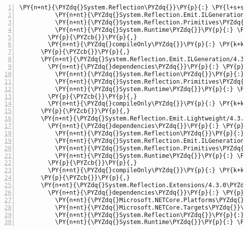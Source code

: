 \begin{Verbatim}[commandchars=\\\{\},numbers=left,firstnumber=1,stepnumber=1,numberblanklines=0]
          \PY{n+nt}{\PYZdq{}System.Reflection\PYZdq{}}\PY{p}{:} \PY{l+s+s2}{\PYZdq{}4.3.0\PYZdq{}}\PY{p}{,}
          \PY{n+nt}{\PYZdq{}System.Reflection.Emit.ILGeneration\PYZdq{}}\PY{p}{:} \PY{l+s+s2}{\PYZdq{}4.3.0\PYZdq{}}\PY{p}{,}
          \PY{n+nt}{\PYZdq{}System.Reflection.Primitives\PYZdq{}}\PY{p}{:} \PY{l+s+s2}{\PYZdq{}4.3.0\PYZdq{}}\PY{p}{,}
          \PY{n+nt}{\PYZdq{}System.Runtime\PYZdq{}}\PY{p}{:} \PY{l+s+s2}{\PYZdq{}4.3.0\PYZdq{}}
        \PY{p}{\PYZcb{}}\PY{p}{,}
        \PY{n+nt}{\PYZdq{}compileOnly\PYZdq{}}\PY{p}{:} \PY{k+kc}{true}
      \PY{p}{\PYZcb{}}\PY{p}{,}
      \PY{n+nt}{\PYZdq{}System.Reflection.Emit.ILGeneration/4.3.0\PYZdq{}}\PY{p}{:} \PY{p}{\PYZob{}}
        \PY{n+nt}{\PYZdq{}dependencies\PYZdq{}}\PY{p}{:} \PY{p}{\PYZob{}}
          \PY{n+nt}{\PYZdq{}System.Reflection\PYZdq{}}\PY{p}{:} \PY{l+s+s2}{\PYZdq{}4.3.0\PYZdq{}}\PY{p}{,}
          \PY{n+nt}{\PYZdq{}System.Reflection.Primitives\PYZdq{}}\PY{p}{:} \PY{l+s+s2}{\PYZdq{}4.3.0\PYZdq{}}\PY{p}{,}
          \PY{n+nt}{\PYZdq{}System.Runtime\PYZdq{}}\PY{p}{:} \PY{l+s+s2}{\PYZdq{}4.3.0\PYZdq{}}
        \PY{p}{\PYZcb{}}\PY{p}{,}
        \PY{n+nt}{\PYZdq{}compileOnly\PYZdq{}}\PY{p}{:} \PY{k+kc}{true}
      \PY{p}{\PYZcb{}}\PY{p}{,}
      \PY{n+nt}{\PYZdq{}System.Reflection.Emit.Lightweight/4.3.0\PYZdq{}}\PY{p}{:} \PY{p}{\PYZob{}}
        \PY{n+nt}{\PYZdq{}dependencies\PYZdq{}}\PY{p}{:} \PY{p}{\PYZob{}}
          \PY{n+nt}{\PYZdq{}System.Reflection\PYZdq{}}\PY{p}{:} \PY{l+s+s2}{\PYZdq{}4.3.0\PYZdq{}}\PY{p}{,}
          \PY{n+nt}{\PYZdq{}System.Reflection.Emit.ILGeneration\PYZdq{}}\PY{p}{:} \PY{l+s+s2}{\PYZdq{}4.3.0\PYZdq{}}\PY{p}{,}
          \PY{n+nt}{\PYZdq{}System.Reflection.Primitives\PYZdq{}}\PY{p}{:} \PY{l+s+s2}{\PYZdq{}4.3.0\PYZdq{}}\PY{p}{,}
          \PY{n+nt}{\PYZdq{}System.Runtime\PYZdq{}}\PY{p}{:} \PY{l+s+s2}{\PYZdq{}4.3.0\PYZdq{}}
        \PY{p}{\PYZcb{}}\PY{p}{,}
        \PY{n+nt}{\PYZdq{}compileOnly\PYZdq{}}\PY{p}{:} \PY{k+kc}{true}
      \PY{p}{\PYZcb{}}\PY{p}{,}
      \PY{n+nt}{\PYZdq{}System.Reflection.Extensions/4.3.0\PYZdq{}}\PY{p}{:} \PY{p}{\PYZob{}}
        \PY{n+nt}{\PYZdq{}dependencies\PYZdq{}}\PY{p}{:} \PY{p}{\PYZob{}}
          \PY{n+nt}{\PYZdq{}Microsoft.NETCore.Platforms\PYZdq{}}\PY{p}{:} \PY{l+s+s2}{\PYZdq{}2.1.0\PYZhy{}rc1\PYZdq{}}\PY{p}{,}
          \PY{n+nt}{\PYZdq{}Microsoft.NETCore.Targets\PYZdq{}}\PY{p}{:} \PY{l+s+s2}{\PYZdq{}2.1.0\PYZhy{}rc1\PYZdq{}}\PY{p}{,}
          \PY{n+nt}{\PYZdq{}System.Reflection\PYZdq{}}\PY{p}{:} \PY{l+s+s2}{\PYZdq{}4.3.0\PYZdq{}}\PY{p}{,}
          \PY{n+nt}{\PYZdq{}System.Runtime\PYZdq{}}\PY{p}{:} \PY{l+s+s2}{\PYZdq{}4.3.0\PYZdq{}}

\end{Verbatim}
